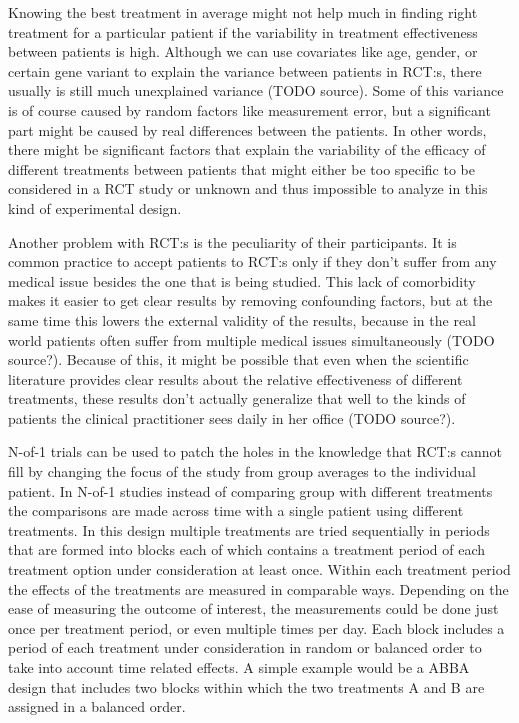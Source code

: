\documentclass[12pt,a4paper,leqno]{report}
\theoremstyle{plain}
\theoremstyle{definition}
\theoremstyle{remark}
\begin{document}
Knowing the best treatment in average might not help much in finding right
treatment for a particular patient if the variability in treatment
effectiveness between patients is high. Although we can use covariates like
age, gender, or certain gene variant to explain the variance between patients
in RCT:s, there usually is still much unexplained variance (TODO source). Some of this
variance is of course caused by random factors like measurement error, but a
significant part might be caused by real differences between the
patients. In other words, there might be significant factors that explain the
variability of the efficacy of different treatments between patients that
might either be too specific to be considered in a RCT study or unknown and
thus impossible to analyze in this kind of experimental design.

Another problem with RCT:s is the peculiarity of their participants. It is common
practice to accept patients to RCT:s only if they don't suffer from any
medical issue besides the one that is being studied. This lack of comorbidity
makes it easier to get clear results by removing confounding factors, but at
the same time this lowers the external validity of the results, because in the
real world patients often suffer from multiple medical issues simultaneously (TODO source?).
Because of this, it might be possible that even when the scientific literature
provides clear results about the relative effectiveness of different treatments, these
results don't actually generalize that well to the kinds of patients the clinical
practitioner sees daily in her office (TODO source?).

N-of-1 trials can be used to patch the holes in the knowledge that RCT:s cannot fill by
changing the focus of the study from group averages to the individual patient. In N-of-1
studies instead of comparing group with different treatments the comparisons are made
across time with a single patient using different treatments. In this design
multiple treatments are tried sequentially in periods that are
formed into blocks each of which contains a treatment period of each treatment option
under consideration at least once. Within each treatment period the effects of the
treatments are measured in comparable ways. Depending on the ease of measuring the outcome
of interest, the measurements could be done just once per treatment period,
or even multiple times per day. Each block includes a period of each treatment under
consideration in random or balanced order to take into account time related
effects. A simple example would be a ABBA design that includes two blocks within
which the two treatments A and B are assigned in a balanced order.
\end{document}
